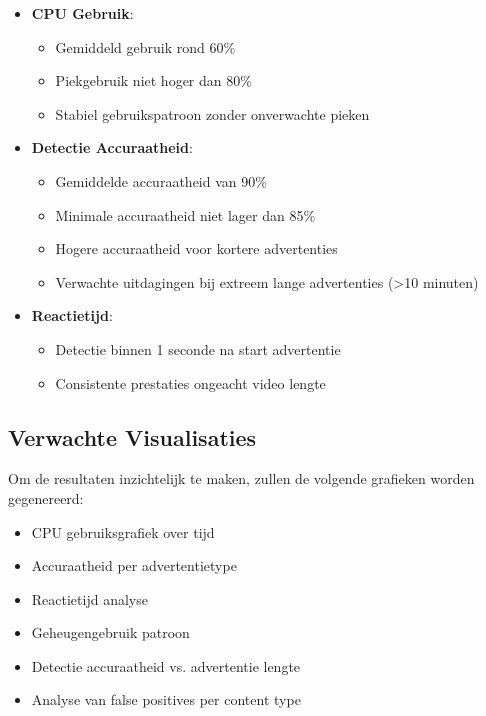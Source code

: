 \begin{itemize}
    \item \textbf{CPU Gebruik}:
    \begin{itemize}
        \item Gemiddeld gebruik rond 60\%
        \item Piekgebruik niet hoger dan 80\%
        \item Stabiel gebruikspatroon zonder onverwachte pieken
    \end{itemize}
    
    \item \textbf{Detectie Accuraatheid}:
    \begin{itemize}
        \item Gemiddelde accuraatheid van 90\%
        \item Minimale accuraatheid niet lager dan 85\%
        \item Hogere accuraatheid voor kortere advertenties
        \item Verwachte uitdagingen bij extreem lange advertenties (>10 minuten)
    \end{itemize}
    
    \item \textbf{Reactietijd}:
    \begin{itemize}
        \item Detectie binnen 1 seconde na start advertentie
        \item Consistente prestaties ongeacht video lengte
    \end{itemize}
\end{itemize}

\subsection{Verwachte Visualisaties}
Om de resultaten inzichtelijk te maken, zullen de volgende grafieken worden gegenereerd:

\begin{itemize}
    \item CPU gebruiksgrafiek over tijd
    \item Accuraatheid per advertentietype
    \item Reactietijd analyse
    \item Geheugengebruik patroon
    \item Detectie accuraatheid vs. advertentie lengte
    \item Analyse van false positives per content type
\end{itemize}

